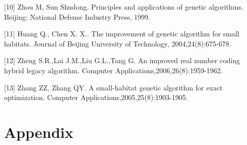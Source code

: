 \documentclass[twocolumn]{article}
\begin{document}
{[}10{]} Zhou M, Sun Shudong. Principles and applications of genetic
algorithms. Beijing: National Defense Industry Press, 1999.

{[}11{]} Huang Q., Chen X. X.. The improvement of genetic algorithm for
small habitats. Journal of Beijing University of Technology,
2004,24(8):675-678.

{[}12{]} Zheng S.R.,Lai J.M.,Liu G.L.,Tang G. An improved real number
coding hybrid legacy algorithm. Computer
Applications,2006,26(8):1959-1962.

{[}13{]} Zhang ZZ, Zhang QY. A small-habitat genetic algorithm for exact
optimization. Computer Applications,2005,25(8):1903-1905.



\newpage
\appendix
\section{Appendix}
\end{document}

